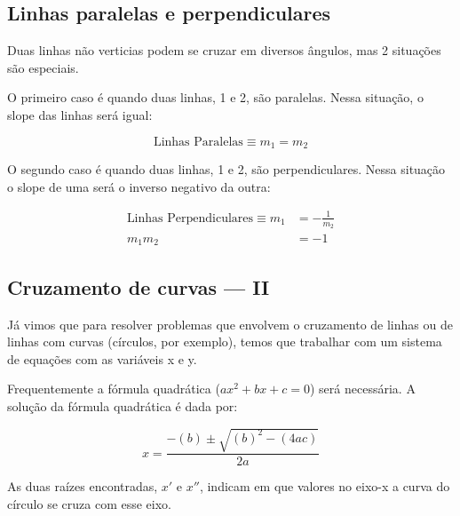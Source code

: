 \documentclass[pdftex, brazil, 12pt, twoside]{article}
\begin{document}
\subsection{Linhas paralelas e perpendiculares}
\label{modelagem-linear-paralelas-perpendiculares}

Duas linhas não verticias podem se cruzar em diversos ângulos, mas 2 situações
são especiais.

O primeiro caso é quando duas linhas, 1 e 2, são paralelas. Nessa situação,
o slope das linhas será igual:

\begin{equation}
  \text{Linhas Paralelas} \equiv m_1 = m_2
\end{equation}

O segundo caso é quando duas linhas, 1 e 2, são perpendiculares. Nessa situação
o slope de uma será o inverso negativo da outra:

\begin{equation}
  \begin{split}
    \text{Linhas Perpendiculares} \equiv m_1    & = -\frac{1}{m_2}\\
                                         m_1m_2 & = -1
  \end{split}
\end{equation}


\subsection{Cruzamento de curvas --- II}
\label{modelagem-linear-cruzamento-curvas-ii}

Já vimos que para resolver problemas que envolvem o cruzamento de linhas ou
de linhas com curvas (círculos, por exemplo), temos que trabalhar com um sistema
de equações com as variáveis x e y.

Frequentemente a fórmula quadrática ($ax^2 + bx + c = 0$) será necessária. A
solução da fórmula quadrática é dada por:

\begin{equation}
  x = \frac{-(b) \pm \sqrt{(b)^2 - (4ac)}}{2a}
\end{equation}

As duas raízes encontradas, $x'$ e $x''$, indicam em que valores no eixo-x a
curva do círculo se cruza com esse eixo.
\end{document}
